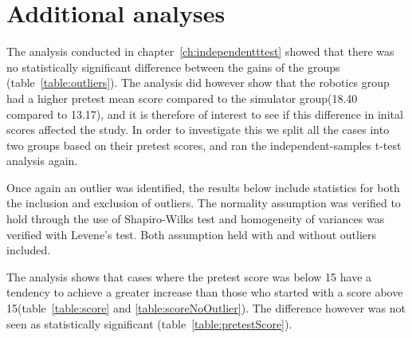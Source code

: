 \section{Additional analyses}\label{ch:additionalTests}
The analysis conducted in chapter~\ref{ch:independentttest} showed that there was no statistically significant difference between the gains of the groups (table~\ref{table:outliers}). 
The analysis did however show that the robotics group had a higher pretest mean score compared to the simulator group(18.40 compared to 13.17), and it is therefore of interest to see if this difference in inital scores affected the study.
In order to investigate this we split all the cases into two groups based on their pretest scores, and ran the independent-samples t-test analysis again.

\bigskip\noindent
Once again an outlier was identified, the results below include statistics for both the inclusion and exclusion of outliers. The normality assumption was verified to hold through the use of Shapiro-Wilks test and homogeneity of variances was verified with Levene's test. Both assumption held with and without outliers included.

\bigskip\noindent
The analysis shows that cases where the pretest score was below 15 have a tendency to achieve a greater increase than those who started with a score above 15(table~\ref{table:score} and \ref{table:scoreNoOutlier}). The difference however was not seen as statistically significant (table~\ref{table:pretestScore}).


